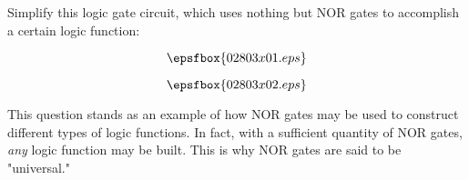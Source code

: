 

Simplify this logic gate circuit, which uses nothing but NOR gates to accomplish a certain logic function:

$$\epsfbox{02803x01.eps}$$







$$\epsfbox{02803x02.eps}$$







This question stands as an example of how NOR gates may be used to construct different types of logic functions.  In fact, with a sufficient quantity of NOR gates, {\it any} logic function may be built.  This is why NOR gates are said to be "universal."




